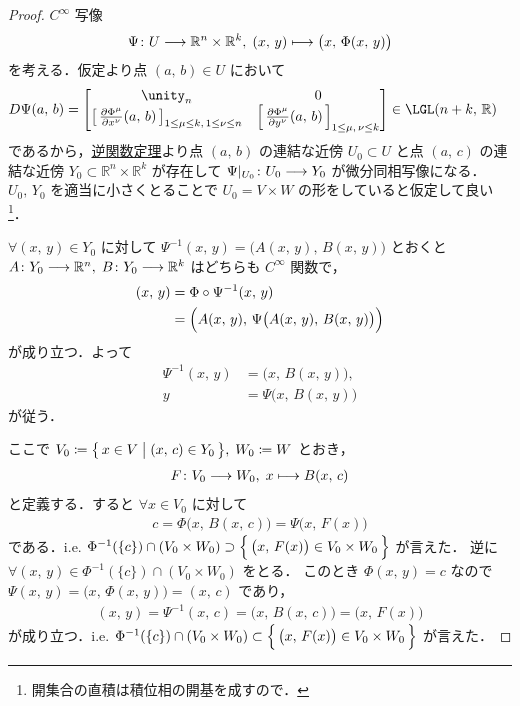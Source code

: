 \documentclass[geometry_main]{subfiles}
\begin{document}
\begin{proof}
    $C^\infty$ 写像
    \begin{align}
        \Psi \colon U \longrightarrow \mathbb{R}^n \times \mathbb{R}^k,\; (x,\, y) \longmapsto \bigl( x,\, \Phi(x,\, y) \bigr) 
    \end{align}
    を考える．仮定より点 $(a,\, b) \in U$ において
    \begin{align}
        D\Psi (a,\, b) 
        &= \mqty[\unity_n & 0 \\ \left[\, \pdv{\Phi^\mu}{x^\nu}()(a,\, b) \,\right]_{1 \le \mu \le k,\, 1 \le \nu \le n} & \left[\, \pdv{\Phi^\mu}{y^\nu}()(a,\, b) \,\right]_{1 \le \mu,\, \nu \le k} ] \in \LGL(n+k,\, \mathbb{R})
    \end{align}
    であるから，\hyperref[thm:inverse-function-Rn]{逆関数定理}より点 $(a,\, b)$ の連結な近傍 $U_0 \subset U$ と点 $(a,\, c)$ の連結な近傍 $Y_0 \subset \mathbb{R}^n \times \mathbb{R}^k$ が存在して $\Psi|_{U_0} \colon U_0 \longrightarrow Y_0$ が微分同相写像になる．$U_0,\, Y_0$ を適当に小さくとることで $U_0 = V \times W$ の形をしていると仮定して良い\footnote{開集合の直積は積位相の開基を成すので．}．

    $\forall (x,\, y) \in Y_0$ に対して $\Psi^{-1}(x,\, y) = \bigl( A(x,\, y),\, B(x,\, y) \bigr)$ とおくと $A\colon Y_0 \longrightarrow \mathbb{R}^n,\; B \colon Y_0 \longrightarrow \mathbb{R}^k$ はどちらも $C^\infty$ 関数で，
    \begin{align}
        (x,\, y)
        &= \Phi \circ \Psi^{-1}(x,\, y) \\
        &= \Bigl( A(x,\, y),\, \Psi \bigl( A(x,\, y),\, B(x,\, y) \bigr)  \Bigr) 
    \end{align}
    が成り立つ．よって
    \begin{align}
        \Psi^{-1}(x,\, y) &= \bigl( x,\, B(x,\, y) \bigr), \\
        y &= \Psi \bigl( x,\, B(x,\, y) \bigr) 
    \end{align}
    が従う．

    ここで $V_0 \coloneqq \bigl\{\, x \in V \bigm| (x,\, c) \in Y_0 \,\bigr\},\; W_0 \coloneqq W$ とおき，
    \begin{align}
        F \colon V_0 \longrightarrow W_0,\; x \longmapsto B(x,\, c)
    \end{align}
    と定義する．すると $\forall x \in V_0$ に対して
    \begin{align}
        c = \Phi \bigl( x,\, B(x,\, c) \bigr) = \Psi \bigl( x,\, F(x) \bigr) 
    \end{align}
    である．i.e. $\Phi^{-1}(\{c\}) \cap (V_0 \times W_0) \supset \Bigl\{\, \bigl( x,\, F(x) \bigr) \in V_0 \times W_0 \,\Bigr\}$ が言えた．
    逆に $\forall (x,\, y) \in \Phi^{-1}(\{c\}) \cap (V_0 \times W_0)$ をとる．
    このとき $\Phi(x,\, y) = c$ なので $\Psi(x,\, y) = \bigl( x,\, \Phi(x,\, y) \bigr) = (x,\, c)$ であり，
    \begin{align}
        (x,\, y) = \Psi^{-1}(x,\, c) = \bigl( x,\, B(x,\, c) \bigr) = \bigl( x,\, F(x) \bigr) 
    \end{align}
    が成り立つ．i.e. $\Phi^{-1}(\{c\}) \cap (V_0 \times W_0) \subset \Bigl\{\, \bigl( x,\, F(x) \bigr) \in V_0 \times W_0 \,\Bigr\}$ が言えた．

\end{proof}
\end{document}
